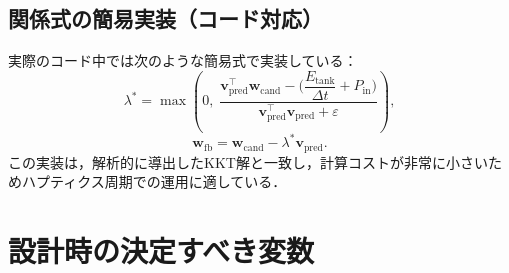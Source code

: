 \documentclass[uplatex]{jsarticle}
\begin{document}
\subsection{関係式の簡易実装（コード対応）}
実際のコード中では次のような簡易式で実装している：
\[
\lambda^\ast=\max\!\left(0,\; \frac{\boldsymbol{v}_{\mathrm{pred}}^\top\boldsymbol{w}_{\mathrm{cand}} - \big(\dfrac{E_{\mathrm{tank}}}{\Delta t} + P_{\mathrm{in}}\big)}{\boldsymbol{v}_{\mathrm{pred}}^\top\boldsymbol{v}_{\mathrm{pred}} + \varepsilon}\right),
\]
\[
\boldsymbol{w}_{\mathrm{fb}} = \boldsymbol{w}_{\mathrm{cand}} - \lambda^\ast \boldsymbol{v}_{\mathrm{pred}}.
\]
この実装は，解析的に導出したKKT解と一致し，計算コストが非常に小さいためハプティクス周期での運用に適している．


\section{設計時の決定すべき変数}
\end{document}
